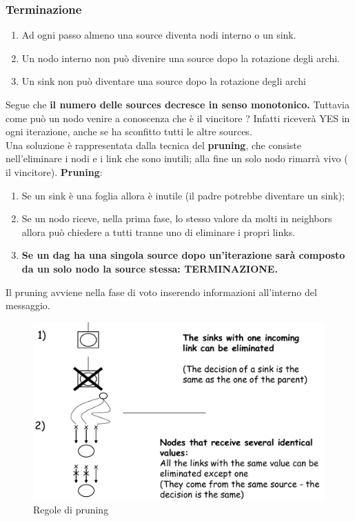 \documentclass[12pt]{article}
\begin{document}
		\subsubsection{Terminazione}
			\begin{enumerate}
				\item Ad ogni passo almeno una source diventa nodi interno o un sink.
				\item Un nodo interno non può divenire una source dopo la rotazione degli archi.
				\item Un sink non può diventare una source dopo la rotazione degli archi
			\end{enumerate}
			Segue che \textbf{ il numero delle sources decresce in senso monotonico.}
			Tuttavia come può un nodo venire a conoscenza che è il vincitore ? Infatti riceverà YES in ogni iterazione, anche se ha sconfitto tutti le altre sources.\\
			Una soluzione è rappresentata dalla tecnica del \textbf{pruning}, che consiste nell'eliminare i nodi e i link che sono inutili; alla fine un solo nodo rimarrà vivo ( il vincitore).
			\textbf{Pruning}:
			\begin{enumerate}
				\item Se un sink è una foglia allora è inutile (il padre potrebbe diventare un sink);
				\item Se un nodo riceve, nella prima fase, lo stesso valore da molti in neighbors allora può chiedere a tutti tranne uno di eliminare i propri links.
				\item \textbf{Se un dag ha una singola source dopo un'iterazione sarà composto da un solo nodo la source stessa: TERMINAZIONE.}
			\end{enumerate}
			Il pruning avviene nella fase di voto inserendo informazioni all'interno del messaggio.
			\begin{figure}[h!]
				\centering
				\includegraphics[scale=0.30]{img/prune.png}
				\caption{Regole di pruning}
			\end{figure}
\end{document}

